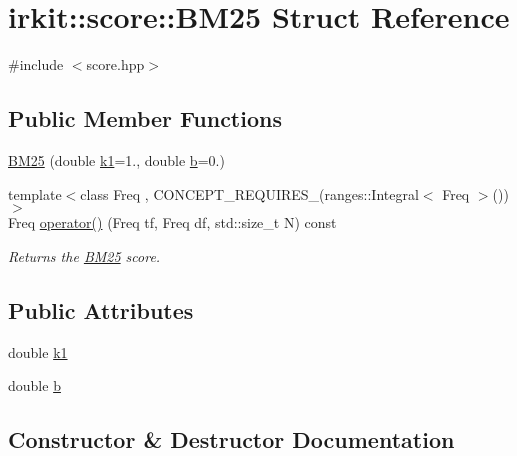 \hypertarget{structirkit_1_1score_1_1BM25}{}\section{irkit\+:\+:score\+:\+:B\+M25 Struct Reference}
\label{structirkit_1_1score_1_1BM25}


{\ttfamily \#include $<$score.\+hpp$>$}

\subsection*{Public Member Functions}
\begin{DoxyCompactItemize}
\item 
\hyperlink{structirkit_1_1score_1_1BM25_ab3914ee4121fac4d7d911b2be83a3c01}{B\+M25} (double \hyperlink{structirkit_1_1score_1_1BM25_a466bb269c6c56714e0148d428bd7e1d5}{k1}=1., double \hyperlink{structirkit_1_1score_1_1BM25_ab68733f61f341e9fe744540192ae5b7c}{b}=0.)
\item 
{\footnotesize template$<$class Freq , C\+O\+N\+C\+E\+P\+T\+\_\+\+R\+E\+Q\+U\+I\+R\+E\+S\+\_\+(ranges\+::\+Integral$<$ Freq $>$()) $>$ }\\Freq \hyperlink{structirkit_1_1score_1_1BM25_a11129a12cf8c95384d6ceb23b68f39ed}{operator()} (Freq tf, Freq df, std\+::size\+\_\+t N) const
\begin{DoxyCompactList}\small\item\em Returns the \hyperlink{structirkit_1_1score_1_1BM25}{B\+M25} score. \end{DoxyCompactList}\end{DoxyCompactItemize}
\subsection*{Public Attributes}
\begin{DoxyCompactItemize}
\item 
double \hyperlink{structirkit_1_1score_1_1BM25_a466bb269c6c56714e0148d428bd7e1d5}{k1}
\item 
double \hyperlink{structirkit_1_1score_1_1BM25_ab68733f61f341e9fe744540192ae5b7c}{b}
\end{DoxyCompactItemize}


\subsection{Constructor \& Destructor Documentation}
\mbox{\label{structirkit_1_1score_1_1BM25_ab3914ee4121fac4d7d911b2be83a3c01}} 
